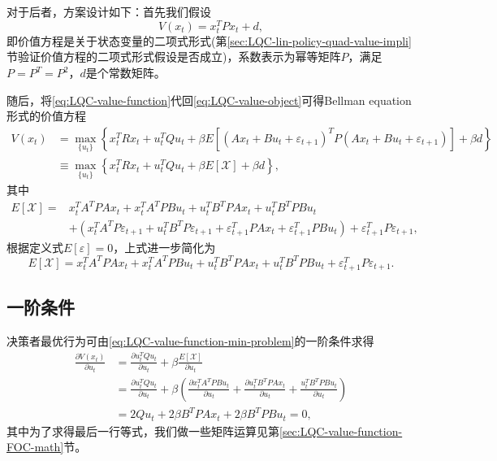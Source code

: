对于后者，方案设计如下：首先我们假设
\begin{equation}
  \label{eq:LQC-value-function}
  V(x_t) = x_t^T P x_t + d,
\end{equation}
即价值方程是关于状态变量的二项式形式(第\ref{sec:LQC-lin-policy-quad-value-impli}节验证价值方程的二项式形式假设是否成立)，系数表示为幂等矩阵$P$，满足$P=P^T=P^2$，$d$是个常数矩阵。

随后，将\eqref{eq:LQC-value-function}代回\eqref{eq:LQC-value-object}可得Bellman equation形式的价值方程
\begin{align}
  V(x_t)&=\max_{\{u_t\}} \left\{
  x_t^T R x_t + u_t^T Q u_t + \beta E \left[
  \left(A x_t + B u_t + \varepsilon_{t+1}\right)^T P \left(A x_t + B u_t + \varepsilon_{t+1}\right)  \right] + \beta d
  \right\} \nonumber \\
\label{eq:LQC-value-function-min-problem}
  &\equiv \max_{\{u_t\}} \left\{
  x_t^T R x_t + u_t^T Q u_t + \beta E \left[
  \mathcal{X}  \right] + \beta d
  \right\},
\end{align}
其中
\begin{align*}
  E [\mathcal{X}] = & x_t^T A^T P A x_t + x_t^T A^T P B u_t + u_t^T B^T P A x_t + u_t^T B^T P B u_t \\
  & + \left(x_t^T A^T P \varepsilon_{t+1}  + u_t^T B^T P \varepsilon_{t+1} + \varepsilon_{t+1}^T P A x_t + \varepsilon_{t+1}^T P B u_t \right)+ \varepsilon_{t+1}^T P \varepsilon_{t+1},
\end{align*}
根据定义式$E[\varepsilon] = 0$，上式进一步简化为
\begin{equation}
  \label{eq:LQC-value-function-auxiliary-mathcalX}
  E [\mathcal{X}] =  x_t^T A^T P A x_t + x_t^T A^T P B u_t + u_t^T B^T P A x_t + u_t^T B^T P B u_t + \varepsilon_{t+1}^T P \varepsilon_{t+1}.
\end{equation}

\subsection{一阶条件}
决策者最优行为可由\eqref{eq:LQC-value-function-min-problem}的一阶条件求得
\begin{align}
  \frac{\partial V(x_t)}{\partial u_t} &=\frac{\partial u_t^T Q u_t}{\partial u_t} + \beta \frac{E[\mathcal X]}{\partial u_t} \nonumber \\
  &= \frac{\partial u_t^T Q u_t}{\partial u_t} + \beta \left(
  \frac{\partial x_t^T A^T P B u_t}{\partial u_t} + \frac{\partial u_t^T B^T P A x_t}{\partial u_t} + \frac{u_t^T B^T P B u_t}{\partial u_t} \right) \nonumber \\
  \label{eq:LQC-value-function-FOC}
  &=2Q u_t + 2 \beta B^T P A x_t + 2 \beta B^T P B u_t= 0,
\end{align}
其中为了求得最后一行等式，我们做一些矩阵运算见第\ref{sec:LQC-value-function-FOC-math}节。
